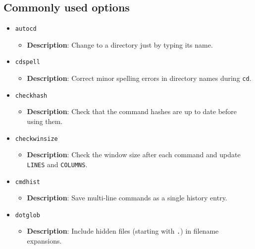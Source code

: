 \documentclass{report}
\begin{document}
    \subsection{Commonly used options}
    \begin{itemize}
        \item \texttt{autocd}
            \begin{itemize}
                \item \textbf{Description}: Change to a directory just by typing its name.
            \end{itemize}

        \item \texttt{cdspell}
            \begin{itemize}
                \item \textbf{Description}: Correct minor spelling errors in directory names during \texttt{cd}.
            \end{itemize}

        \item \texttt{checkhash}
            \begin{itemize}
                \item \textbf{Description}: Check that the command hashes are up to date before using them.
            \end{itemize}

        \item \texttt{checkwinsize}
            \begin{itemize}
                \item \textbf{Description}: Check the window size after each command and update \texttt{LINES} and \texttt{COLUMNS}.
            \end{itemize}

        \item \texttt{cmdhist}
            \begin{itemize}
                \item \textbf{Description}: Save multi-line commands as a single history entry.
            \end{itemize}

        \item \texttt{dotglob}
            \begin{itemize}
                \item \textbf{Description}: Include hidden files (starting with \texttt{.}) in filename expansions.
            \end{itemize}


\end{itemize}
\end{document}
